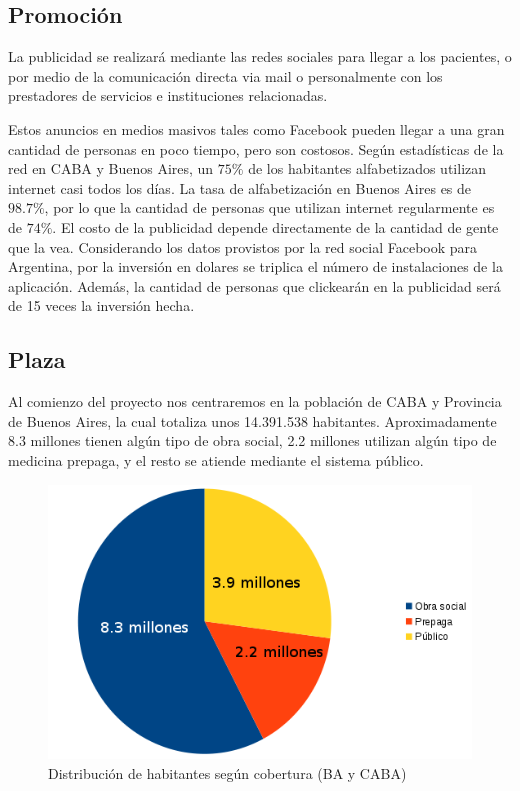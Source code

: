 \documentclass[a4paper,10pt]{article}
\begin{document}
\subsection{Promoción}

La publicidad se realizará mediante las redes sociales para llegar a los pacientes, o por medio de la comunicación directa via mail o personalmente con los prestadores de servicios e instituciones relacionadas.

Estos anuncios en medios masivos tales como Facebook pueden llegar a una gran cantidad de personas en poco tiempo, pero son costosos. Según estadísticas de la red en CABA y Buenos Aires, un $75\%$ de los habitantes alfabetizados utilizan internet casi todos los días. La tasa de alfabetización en Buenos Aires es de $98.7\%$, por lo que la cantidad de personas que utilizan internet regularmente es de $74\%$. El costo de la publicidad depende directamente de la cantidad de gente que la vea. Considerando los datos provistos por la red social Facebook para Argentina, por la inversión en dolares se triplica el número de instalaciones de la aplicación. Además, la cantidad de personas que clickearán en la publicidad será de 15 veces la inversión hecha.

\subsection{Plaza}

Al comienzo del proyecto nos centraremos en la población de CABA y Provincia de Buenos Aires, la cual totaliza unos 14.391.538 habitantes. Aproximadamente 8.3 millones tienen algún tipo de obra social, 2.2 millones utilizan algún tipo de medicina prepaga, y el resto se atiende mediante el sistema público. 

\begin{center}
\begin{figure}[H]
\centering
\includegraphics[width=1\textwidth]{./Imagenes/g1.png}
\caption{Distribución de habitantes según cobertura (BA y CABA)}
\label{fig:hp}
\end{figure}
\end{center}
\end{document}
